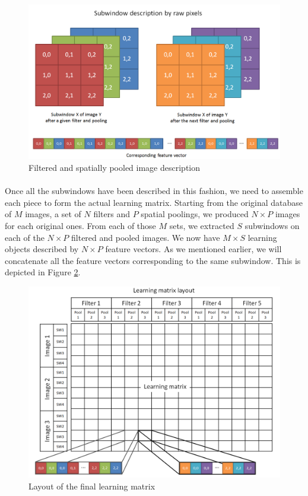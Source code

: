 \documentclass[a4paper]{report}
\begin{document}
	\begin{figure}
		\centering
			\includegraphics[width=1.0\textwidth]{images/imgDesc.png}
		\caption{\label{fig:imgDesc}Filtered and spatially pooled image description}
	\end{figure}
	
	\paragraph{}
	Once all the subwindows have been described in this fashion, we need to assemble each piece to form the actual learning matrix.
	Starting from the original database of $M$ images, a set of $N$ filters and $P$ spatial poolings, we produced $N \times P$ images for each original ones. From each of those $M$ sets, we extracted $S$ subwindows on each of the $N \times P$ filtered and pooled images. We now have $M \times S$ learning objects described by $N \times P$ feature vectors. As we mentioned earlier, we will concatenate all the feature vectors corresponding to the same subwindow. This is depicted in Figure \ref{fig:LearningMatrix}.
	
	\begin{figure}
		\centering
			\includegraphics[width=1.0\textwidth]{images/LearningMatrix.png}
		\caption{\label{fig:LearningMatrix}Layout of the final learning matrix}
	\end{figure}	
		
\end{document}
